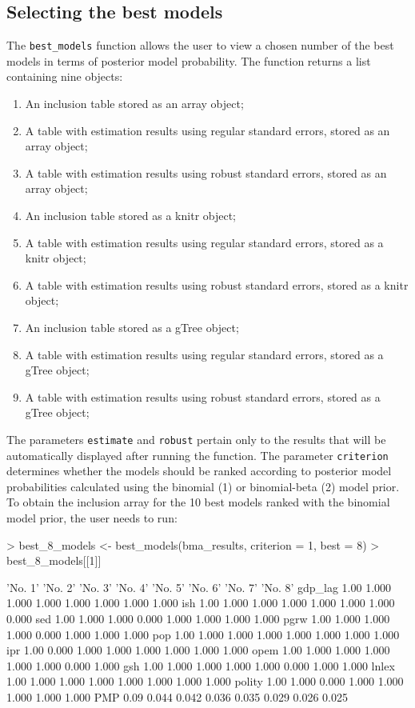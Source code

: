 \documentclass[a4paper]{article}
\begin{document}
\subsection{Selecting the best models}
The \verb+best_models+ function allows the user to view a chosen number of the best models in terms of posterior model probability. The function returns a list containing nine objects:
\begin{enumerate}
    \item An inclusion table stored as an array object;
    \item A table with estimation results using regular standard errors, stored as an array object;
    \item A table with estimation results using robust standard errors, stored as an array object;
    \item An inclusion table stored as a knitr object;
    \item A table with estimation results using regular standard errors, stored as a knitr object;
    \item A table with estimation results using robust standard errors, stored as a knitr object;
    \item An inclusion table stored as a gTree object;
    \item A table with estimation results using regular standard errors, stored as a gTree object;
    \item A table with estimation results using robust standard errors, stored as a gTree object;
\end{enumerate}
The parameters \verb+estimate+ and \verb+robust+ pertain only to the results that will be automatically displayed after running the function. The parameter \verb+criterion+ determines whether the models should be ranked according to posterior model probabilities calculated using the binomial (1) or binomial-beta (2) model prior. To obtain the inclusion array for the 10 best models ranked with the binomial model prior, the user needs to run:
\begin{Schunk}
\begin{Sinput}
> best_8_models <- best_models(bma_results, criterion = 1, best = 8)
> best_8_models[[1]]
\end{Sinput}
\begin{Soutput}
        'No. 1' 'No. 2' 'No. 3' 'No. 4' 'No. 5' 'No. 6' 'No. 7' 'No. 8'
gdp_lag    1.00   1.000   1.000   1.000   1.000   1.000   1.000   1.000
ish        1.00   1.000   1.000   1.000   1.000   1.000   1.000   0.000
sed        1.00   1.000   1.000   0.000   1.000   1.000   1.000   1.000
pgrw       1.00   1.000   1.000   1.000   0.000   1.000   1.000   1.000
pop        1.00   1.000   1.000   1.000   1.000   1.000   1.000   1.000
ipr        1.00   0.000   1.000   1.000   1.000   1.000   1.000   1.000
opem       1.00   1.000   1.000   1.000   1.000   1.000   0.000   1.000
gsh        1.00   1.000   1.000   1.000   1.000   0.000   1.000   1.000
lnlex      1.00   1.000   1.000   1.000   1.000   1.000   1.000   1.000
polity     1.00   1.000   0.000   1.000   1.000   1.000   1.000   1.000
PMP        0.09   0.044   0.042   0.036   0.035   0.029   0.026   0.025
\end{Soutput}
\end{Schunk}
\end{document}
